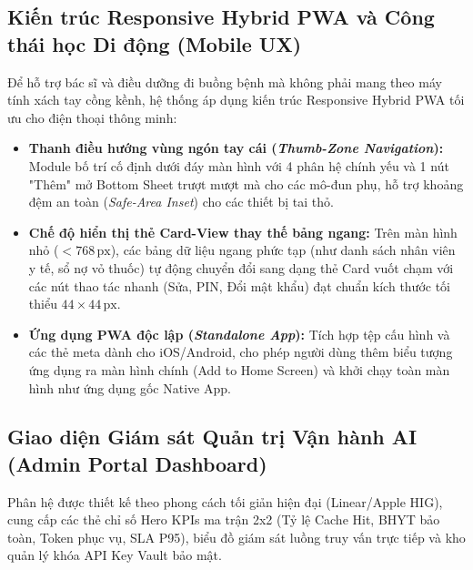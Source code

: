 \subsection{Kiến trúc Responsive Hybrid PWA và Công thái học Di động (Mobile UX)}
Để hỗ trợ bác sĩ và điều dưỡng đi buồng bệnh mà không phải mang theo máy tính xách tay cồng kềnh, hệ thống áp dụng kiến trúc Responsive Hybrid PWA tối ưu cho điện thoại thông minh:
\begin{itemize}[leftmargin=1.5em]
    \item \textbf{Thanh điều hướng vùng ngón tay cái (\textit{Thumb-Zone Navigation}):} Module  bố trí cố định dưới đáy màn hình với 4 phân hệ chính yếu và 1 nút "Thêm" mở Bottom Sheet trượt mượt mà cho các mô-đun phụ, hỗ trợ khoảng đệm an toàn (\textit{Safe-Area Inset}) cho các thiết bị tai thỏ.
    \item \textbf{Chế độ hiển thị thẻ Card-View thay thế bảng ngang:} Trên màn hình nhỏ ($< 768\,\text{px}$), các bảng dữ liệu ngang phức tạp (như danh sách nhân viên y tế, sổ nợ vỏ thuốc) tự động chuyển đổi sang dạng thẻ Card vuốt chạm với các nút thao tác nhanh (Sửa, PIN, Đổi mật khẩu) đạt chuẩn kích thước tối thiểu $44 \times 44\,\text{px}$.
    \item \textbf{Ứng dụng PWA độc lập (\textit{Standalone App}):} Tích hợp tệp cấu hình  và các thẻ meta dành cho iOS/Android, cho phép người dùng thêm biểu tượng ứng dụng ra màn hình chính (Add to Home Screen) và khởi chạy toàn màn hình như ứng dụng gốc Native App.
\end{itemize}

\subsection{Giao diện Giám sát Quản trị Vận hành AI (Admin Portal Dashboard)}
Phân hệ  được thiết kế theo phong cách tối giản hiện đại (Linear/Apple HIG), cung cấp các thẻ chỉ số Hero KPIs ma trận 2x2 (Tỷ lệ Cache Hit, BHYT bảo toàn, Token phục vụ, SLA P95), biểu đồ giám sát luồng truy vấn trực tiếp và kho quản lý khóa API Key Vault bảo mật.
